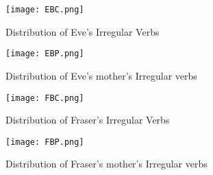 \begin{figure}[!htb]
\begin{minipage}{0.5\linewidth}
    \texttt{[image: EBC.png]}
    \caption{Distribution of Eve's Irregular Verbs}
\end{minipage}
\begin{minipage}{0.5\linewidth}    \texttt{[image: EBP.png]}
    \caption{Distribution of Eve's mother's Irregular verbs}
\end{minipage}
\end{figure}
\vspace{-2em}
\begin{figure}[!htp]
\begin{minipage}{0.5\linewidth}
    \texttt{[image: FBC.png]}
    \caption{Distribution of Fraser's Irregular Verbs}
\end{minipage}
\begin{minipage}{0.5\linewidth}
    \texttt{[image: FBP.png]}
    \caption{Distribution of Fraser's mother's Irregular verbs}
\end{minipage}
\end{figure}